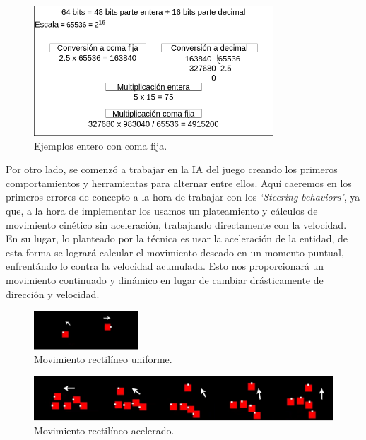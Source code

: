 


\begin{figure}[htb]
\centering
\includegraphics[width=0.8\textwidth]{imagenes/diario_desarrollo/Entero_fijo.png}
\caption{Ejemplos entero con coma fija.}
\label{fig:fixed}
\end{figure} 

Por otro lado, se comenzó a trabajar en la \ac{IA} del juego creando los primeros comportamientos
y herramientas para alternar entre ellos. Aquí caeremos en los primeros errores de concepto a la
hora de trabajar con los \textit{`Steering behaviors'}, ya que, a la hora de implementar los
usamos un plateamiento y cálculos de movimiento cinético sin aceleración, trabajando directamente 
con la velocidad.\\
En su lugar, lo planteado por la técnica es usar la aceleración de la entidad, de esta forma se 
logrará calcular el movimiento deseado en un momento puntual, enfrentándo lo contra la velocidad 
acumulada. Esto nos proporcionará un movimiento continuado y dinámico en lugar de cambiar drásticamente de 
dirección y velocidad.

\begin{figure}[htb]
\centering
\includegraphics[width=0.35\textwidth]{imagenes/diario_desarrollo/mov1.png}
\caption{Movimiento rectilíneo uniforme.}
\label{fig:mru}
\end{figure} 

\begin{figure}[htb]
\centering
\includegraphics[width=1\textwidth]{imagenes/diario_desarrollo/mov2.png}
\caption{Movimiento rectilíneo acelerado.}
\label{fig:mra}
\end{figure} 

